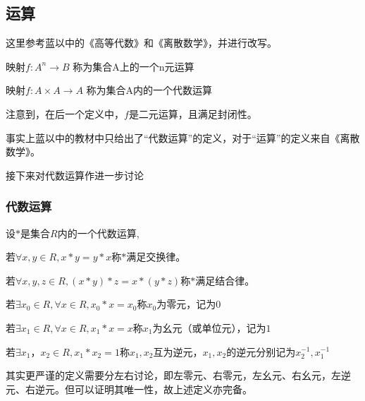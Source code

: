 \documentclass[12pt,hyperref,a4paper,UTF8]{ctexart}
\begin{document}
\subsection{运算}
这里参考蓝以中的《高等代数》和《离散数学》，并进行改写。

\begin{Definition}
映射$f:A^n\rightarrow B$ 称为集合A上的一个n元运算
\end{Definition}

\begin{Definition}
映射$f:A\times A\rightarrow A$ 称为集合A内的一个代数运算
\end{Definition}

注意到，在后一个定义中，$f$是二元运算，且满足封闭性。

事实上蓝以中的教材中只给出了“代数运算”的定义，对于“运算”的定义来自《离散数学》。

接下来对代数运算作进一步讨论

\subsubsection{代数运算}\label{daishu}
设$*$是集合$R$内的一个代数运算,


\begin{Definition}
    若$\forall x,y \in R,x*y=y*x$称$*$满足交换律。
\end{Definition}

\begin{Definition}
    若$\forall x,y,z \in R,(x*y)*z=x*(y*z)$称$*$满足结合律。
\end{Definition}
    

\begin{Definition}
    若$\exists x_0 \in R,\forall x \in R,x_0*x=x_0$称$x_0$为零元，记为$0$
\end{Definition}


\begin{Definition}
    若$\exists x_1 \in R,\forall x \in R,x_1*x=x$称$x_1$为幺元（或单位元），记为$1$
\end{Definition}


\begin{Definition}
  若$\exists x_1，x_2 \in R,x_1*x_2=1$称$x_1,x_2$互为逆元，$x_1,x_2$的逆元分别记为$x_2^{-1},x_1^{-1}$  
\end{Definition}



其实更严谨的定义需要分左右讨论，即左零元、右零元，左幺元、右幺元，左逆元、右逆元。但可以证明其唯一性，故上述定义亦完备。
\end{document}
